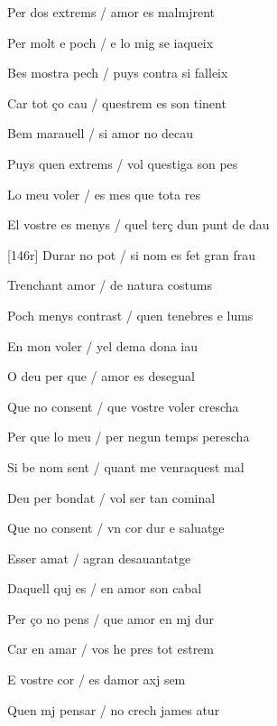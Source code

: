 \documentclass[12pt]{article}
\begin{document}
\begin{estrofa}

 Per dos extrems / amor es malmjrent

 Per molt e poch / e lo mig se iaqueix

 Bes mostra pech / puys contra si falleix

 Car tot \c{c}o cau / questrem es son tinent

 Bem marauell / si amor no decau

 Puys quen extrems / vol questiga son pes

 Lo meu voler / es mes que tota res

 El vostre es menys / quel ter\c{c} dun punt de dau

\end{estrofa}



\begin{estrofa}

 [146r] Durar no pot / si nom es fet gran frau

 Trenchant amor / de natura costums

 Poch menys contrast / quen tenebres e lums

 En mon voler / yel dema dona iau

 O deu per que / amor es desegual

 Que no consent / que vostre voler crescha

 Per que lo meu / per negun temps perescha

 Si be nom sent / quant me venraquest mal

\end{estrofa}



\begin{estrofa}

 Deu per bondat / vol ser tan cominal

 Que no consent / vn cor dur e saluatge

 Esser amat / agran desauantatge

 Daquell quj es / en amor son cabal

 Per \c{c}o no pens / que amor en mj dur

 Car en amar / vos he pres tot estrem

 E vostre cor / es damor axj sem

 Quen mj pensar / no crech james atur

\end{estrofa}
\end{document}
